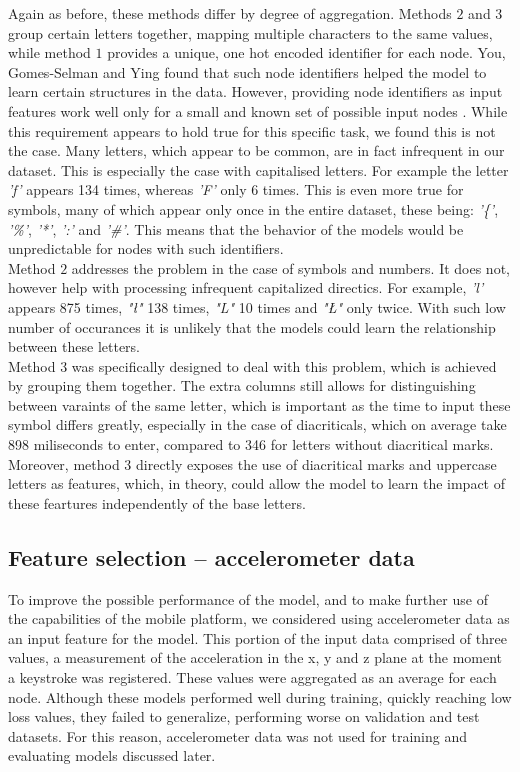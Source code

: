 Again as before, these methods differ by degree of aggregation. Methods $2$ and $3$ group certain letters together, mapping multiple characters to the same values, while method $1$ provides a unique, one hot encoded identifier for each node. You, Gomes-Selman and Ying \cite{you2021identityawaregraphneuralnetworks}
found that such node identifiers helped the model to learn certain structures in the data. However, providing node identifiers as input features work well only for a small and known set of possible input nodes \cite{Lesk2024}. While this requirement appears to hold true for this specific task, we found this is not the case. 
Many letters, which appear to be common, are in fact infrequent in our dataset. This is especially the case with capitalised letters. For example the letter \textit{'f'} appears 134 times, whereas \textit{'F'} only 6 times. This is even more true for symbols, many of which appear only once in the entire dataset, these being: \textit{'\{'}, \textit{'\%'}, \textit{'*'}, \textit{':'} and \textit{'\#'}.
This means that the behavior of the models would be unpredictable for nodes with such identifiers.\\
Method $2$ addresses the problem in the case of symbols and numbers. It does not, however help with processing infrequent capitalized directics. For example, \textit{'l'} appears 875 times, \textit{"ł"} 138 times, \textit{"L"} 10 times and \textit{"Ł"} only twice. With such low number of occurances it is unlikely that the models could learn the relationship between these letters. \\
Method $3$ was specifically designed to deal with this problem, which is achieved by grouping them together. The extra columns still allows for distinguishing between varaints of the same letter, which is important as the time to input these symbol differs greatly, especially in the case of diacriticals, which on average take 898 miliseconds to enter, compared to 346 for letters without diacritical marks.
Moreover, method $3$ directly exposes the use of diacritical marks and uppercase letters as features, which, in theory, could allow the model to learn the impact of these feartures independently of the base letters. 

\subsection{Feature selection -- accelerometer data} \label{accel_subsection}
To improve the possible performance of the model, and to make further use of the capabilities of the mobile platform, we considered using accelerometer data as an input feature for the model. %
This portion of the input data comprised of three values, a measurement of the acceleration in the x, y and z plane at the moment a keystroke was registered. 
These values were aggregated as an average for each node. Although these models performed well during training, quickly reaching low loss values, they failed to generalize, performing worse on validation and test datasets. For this reason, accelerometer data was not used for training and evaluating models discussed later.

